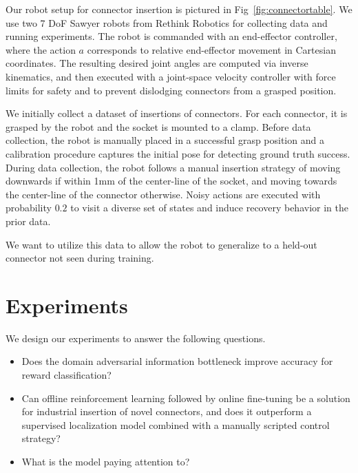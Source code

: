 \FloatBarrier

Our robot setup for connector insertion is pictured in Fig~\ref{fig:connectortable}. We use two 7 DoF Sawyer robots from Rethink Robotics for collecting data and running experiments. The robot is commanded with an end-effector controller, where the action $a$ corresponds to relative end-effector movement in Cartesian coordinates. The resulting desired joint angles are computed via inverse kinematics, and then executed with a joint-space velocity controller with force limits for safety and to prevent dislodging connectors from a grasped position.

We initially collect a dataset of insertions of \numconnectors{} connectors. For each connector, it is grasped by the robot and the socket is mounted to a clamp. Before data collection, the robot is manually placed in a successful grasp position and a calibration procedure captures the initial pose for detecting ground truth success. During data collection, the robot follows a manual insertion strategy of moving downwards if within 1mm of the center-line of the socket, and moving towards the center-line of the connector otherwise. Noisy actions are executed with probability $0.2$ to visit a diverse set of states and induce recovery behavior in the prior data.

We want to utilize this data to allow the robot to generalize to a held-out connector not seen during training.


\section{Experiments}







We design our experiments to answer the following questions.
\begin{itemize}
    \item Does the domain adversarial information bottleneck improve accuracy for reward classification?
    \item Can offline reinforcement learning followed by online fine-tuning be a solution for industrial insertion of novel connectors, and does it outperform a supervised localization model combined with a manually scripted control strategy?
    \item What is the model paying attention to?
\end{itemize}

